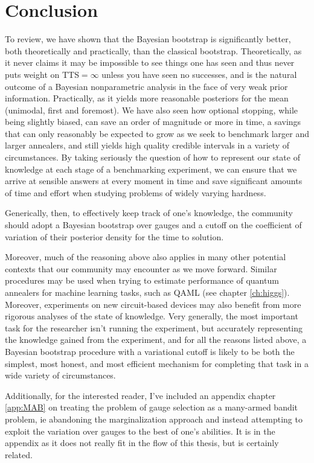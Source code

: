 \section{Conclusion}
To review, we have shown that the Bayesian bootstrap is significantly better, both theoretically and practically, than the classical bootstrap. Theoretically, as it never claims it may be impossible to see things one has seen and thus never puts weight on TTS$=\infty$ unless you have seen no successes, and is the natural outcome of a Bayesian nonparametric analysis in the face of very weak prior information. Practically, as it yields more reasonable posteriors for the mean (unimodal, first and foremost). We have also seen how optional stopping, while being slightly biased, can save an order of magnitude or more in time, a savings that can only reasonably be expected to grow as we seek to benchmark larger and larger annealers, and still yields high quality credible intervals in a variety of circumstances. By taking seriously the question of how to represent our state of knowledge at each stage of a benchmarking experiment, we can ensure that we arrive at sensible answers at every moment in time and save significant amounts of time and effort when studying problems of widely varying hardness.

Generically, then, to effectively keep track of one's knowledge, the community should adopt a Bayesian bootstrap over gauges and a cutoff on the coefficient of variation of their posterior density for the time to solution.

Moreover, much of the reasoning above also applies in many other potential contexts that our community may encounter as we move forward. Similar procedures may be used when trying to estimate performance of quantum annealers for machine learning tasks, such as QAML (see chapter \ref{ch:higgs}). Moreover, experiments on new circuit-based devices may also benefit from more rigorous analyses of the state of knowledge. Very generally, the most important task for the researcher isn't running the experiment, but accurately representing the knowledge gained from the experiment, and for all the reasons listed above, a Bayesian bootstrap procedure with a variational cutoff is likely to be both the simplest, most honest, and most efficient mechanism for completing that task in a wide variety of circumstances.

Additionally, for the interested reader, I've included an appendix chapter \ref{app:MAB} on treating the problem of gauge selection as a many-armed bandit problem, ie abandoning the marginalization approach and instead attempting to exploit the variation over gauges to the best of one's abilities. It is in the appendix as it does not really fit in the flow of this thesis, but is certainly related.

